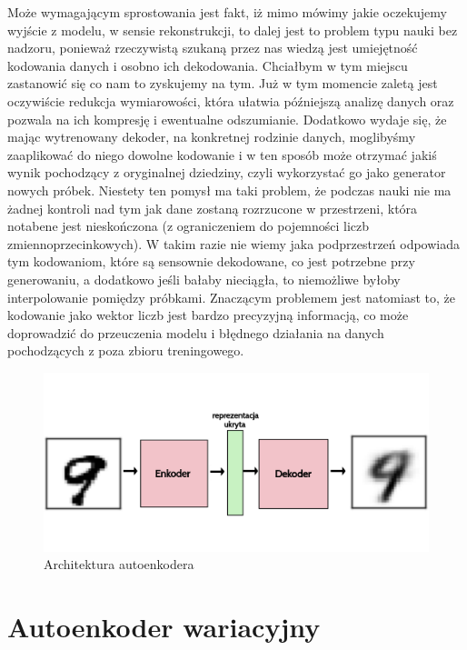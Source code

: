 Może wymagającym sprostowania jest fakt, iż mimo mówimy jakie oczekujemy wyjście z modelu, w sensie rekonstrukcji, to dalej jest to problem typu nauki bez nadzoru, ponieważ rzeczywistą szukaną przez nas wiedzą jest umiejętność kodowania danych i osobno ich dekodowania. Chciałbym w tym miejscu zastanowić się co nam to zyskujemy na tym. Już w tym momencie zaletą jest oczywiście redukcja wymiarowości, która ułatwia późniejszą analizę danych oraz pozwala na ich kompresję i ewentualne odszumianie. Dodatkowo wydaje się, że mając wytrenowany dekoder, na konkretnej rodzinie danych, moglibyśmy zaaplikować do niego dowolne kodowanie i w ten sposób może otrzymać jakiś wynik pochodzący z oryginalnej dziedziny, czyli wykorzystać go jako generator nowych próbek. Niestety ten pomysł ma taki problem, że podczas nauki nie ma żadnej kontroli nad tym jak dane zostaną rozrzucone w przestrzeni, która notabene jest nieskończona (z ograniczeniem do pojemności liczb zmiennoprzecinkowych). W takim razie nie wiemy jaka podprzestrzeń odpowiada tym kodowaniom, które są sensownie dekodowane, co jest potrzebne przy generowaniu, a dodatkowo jeśli bałaby nieciągła, to niemożliwe byłoby interpolowanie pomiędzy próbkami. Znaczącym problemem jest natomiast to, że kodowanie jako wektor liczb jest bardzo precyzyjną informacją, co może doprowadzić do przeuczenia modelu i błędnego działania na danych pochodzących z poza zbioru treningowego.

\begin{figure}[h!]
    \centering
    \includegraphics[width=1\textwidth]{images/autoenc}
    \caption{Architektura autoenkodera}
    \label{fig:autoenc}
\end{figure}

\section{Autoenkoder wariacyjny}

